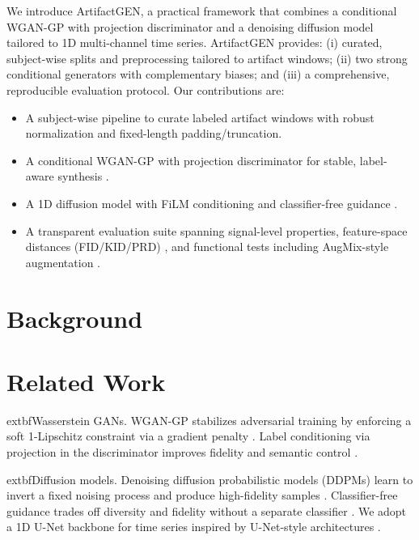 \documentclass{article}
\begin{document}
We introduce ArtifactGEN, a practical framework that combines a conditional WGAN-GP with projection discriminator and a denoising diffusion model tailored to 1D multi-channel time series. ArtifactGEN provides: (i) curated, subject-wise splits and preprocessing tailored to artifact windows; (ii) two strong conditional generators with complementary biases; and (iii) a comprehensive, reproducible evaluation protocol. Our contributions are:
\begin{itemize}
    \item A subject-wise pipeline to curate labeled artifact windows with robust normalization and fixed-length padding/truncation.
    \item A conditional WGAN-GP with projection discriminator for stable, label-aware synthesis \citep{gulrajani2017improved,miyato2018cgans}.
    \item A 1D diffusion model with FiLM conditioning and classifier-free guidance \citep{ho2020denoising,ho2022classifierfree}.
    \item A transparent evaluation suite spanning signal-level properties, feature-space distances (FID/KID/PRD) \citep{heusel2017gans,binkowski2018demystifying,sajjadi2018assessing}, and functional tests including AugMix-style augmentation \citep{hendrycks2020augmix}.
\end{itemize}


\section{Background}



\section{Related Work}
	extbf{Wasserstein GANs.} WGAN-GP stabilizes adversarial training by enforcing a soft 1-Lipschitz constraint via a gradient penalty \citep{gulrajani2017improved}. Label conditioning via projection in the discriminator improves fidelity and semantic control \citep{miyato2018cgans}.

	extbf{Diffusion models.} Denoising diffusion probabilistic models (DDPMs) learn to invert a fixed noising process and produce high-fidelity samples \citep{ho2020denoising}. Classifier-free guidance trades off diversity and fidelity without a separate classifier \citep{ho2022classifierfree}. We adopt a 1D U-Net backbone for time series inspired by U-Net-style architectures \citep{ronneberger2015u}.
\end{document}

